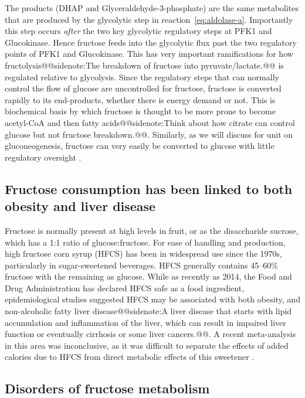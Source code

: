 \documentclass{tufte-handout}
\makeatletter
\def\sidenote#1{@@sidenote:#1@@}
\makeatother
\begin{document}
The products (DHAP and Glyceraldehyde-3-phosphate) are the same metabolites that are produced by the glycolytic step in reaction~\ref{eq:aldolase-a}.  Importantly this step occurs \emph{after} the two key glycolytic regulatory steps at PFK1 and Glucokinase. Hence fructose feeds into the glycolytic flux past the two regulatory points of PFK1 and Glucokinase. This has very important ramifications for how fructolysis\sidenote{The breakdown of fructose into pyruvate/lactate.} is regulated  relative to glycolysis.  Since the regulatory steps that can normally control the flow of glucose are uncontrolled for fructose, fructose is converted rapidly to its end-products, whether there is energy demand or not.  This is biochemical basis by which fructose is thought to be more prone to become acetyl-CoA and then fatty acids\sidenote{Think about how citrate can control glucose but not fructose breakdown.}.  Similarly, as we will discuss for unit on gluconeogenesis, fructose can very easily be converted to glucose with little regulatory oversight \citep{Kim2016d}.

\subsection{Fructose consumption has been linked to both obesity and liver disease}

Fructose is normally present at high levels in fruit, or as the disaccharide sucrose, which has a 1:1 ratio of glucose:fructose.  For ease of handling and production, high fructose corn syrup (HFCS) has been in widespread use since the 1970s, particularly in sugar-sweetened beverages.  HFCS generally contains 45--60\% fructose with the remaining as glucose.   While as recently as 2014, the Food and Drug Administration has declared HFCS safe as a food ingredient, epidemiological studies suggested HFCS may be associated with both obesity, and non-alcoholic fatty liver disease\sidenote{A liver disease that starts with lipid accumulation and inflammation of the liver, which can result in impaired liver function or eventually cirrhosis or some liver cancers.}.  A recent meta-analysis in this area was inconclusive, as it was difficult to separate the effects of added calories due to HFCS from direct metabolic effects of this sweetener \citep{Chung2014}.

\subsection{Disorders of fructose metabolism}
\end{document}
